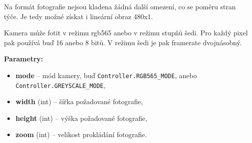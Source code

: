 \documentclass[12pt,notitlepage]{report}
\newcommand{\code}[1]{\texttt{\small #1}}
\newenvironment{popis}%
{\begin{list}{}%
         {\setlength{\leftmargin}{0.5cm}\setlength{\topsep}{1pt}
          \setlength{\itemsep}{0.1cm} \setlength{\parsep}{0.2cm}}%
         \item[]%
}
{\end{list}}
\begin{document}
\begin{popis}
\begin{popis}
        Na formát fotografie nejsou kladena žádná další omezení, co se poměru
        stran týče. Je tedy možné získat i lineární obraz 480x1.

        Kamera může fotit v režimu rgb565 anebo v režimu stupňů šedi. Pro každý
        pixel pak používá buď 16 anebo 8 bitů. V režimu šedi je pak framerate
        dvojnásobný.

        {\bf Parametry:}
        \begin{itemize}
            \item {\bf mode} -- mód kamery, buď \code{Controller.RGB565\_MODE},
                anebo \\ \code{Controller.GREYSCALE\_MODE},
            \item {\bf width} (int) -- šířka požadované fotografie,
            \item {\bf height} (int) -- výška požadované fotografie,
            \item {\bf zoom} (int) -- velikost prokládání fotografie.
        \end{itemize}
        \end{popis}
    \end{popis}




\end{document}
